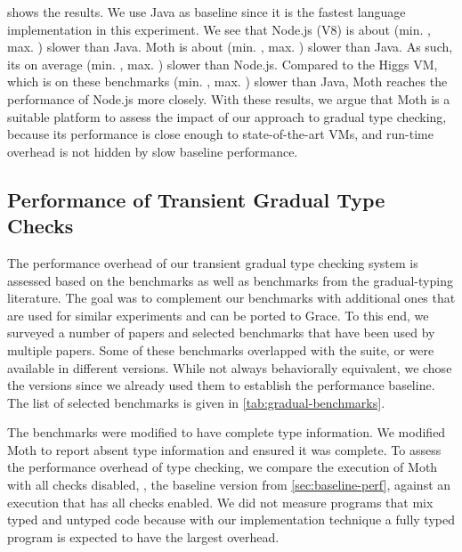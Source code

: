  shows the results.
We use Java as baseline since it is the fastest language implementation
in this experiment.
We see that Node.js (V8) is about
\OverheadNodeGMeanX (min. \OverheadNodeMinX, max. \OverheadNodeMaxX)
slower than Java.
Moth is about \OverheadMothGMeanX (min. \OverheadMothMinX, max. \OverheadMothMaxX) slower than Java.
As such, its on average \OverheadMothNodeGMeanP (min. \OverheadMothNodeMinP, max. \OverheadMothNodeMaxX) slower than Node.js.
Compared to the Higgs VM, which is on these benchmarks
\OverheadHiggsGMeanX (min. \OverheadHiggsMinX, max. \OverheadHiggsMaxX) slower than Java,
Moth reaches the performance of Node.js more closely.
With these results, we argue that Moth is a suitable platform to
assess the impact of our approach to gradual type checking,
because its performance is close enough to state-of-the-art VMs,
and run-time overhead is not hidden by slow baseline performance.


\subsection{Performance of Transient Gradual Type Checks}


The performance overhead of our transient gradual type checking system
is assessed based on the \AWFY benchmarks
as well as benchmarks from the gradual-typing literature.
The goal was to complement our benchmarks with additional ones that are
used for similar experiments and can be ported to Grace.
To this end, we surveyed a number of papers\citep{Takikawa2016,Vitousek2017,Muehlboeck2017,Bauman2017,Richards2017,Stulova2016,Greenman2018}
and selected benchmarks that have been used by multiple papers.
Some of these benchmarks overlapped with the \AWFY suite,
or were available in different versions.
While not always behaviorally equivalent,
we chose the \AWFY versions since we already used them to
establish the performance baseline.
The list of selected benchmarks is given in \cref{tab:gradual-benchmarks}.

The benchmarks were modified to have complete type information.
We modified Moth to report absent type information and ensured it was complete.
To assess the performance overhead of type checking,
we compare the execution of Moth with all checks disabled, \ie, the baseline version from 
\cref{sec:baseline-perf}, against an execution that has all checks enabled.
We did not measure programs that mix typed and untyped code
because with our implementation technique a fully typed program is expected to
have the largest overhead.

